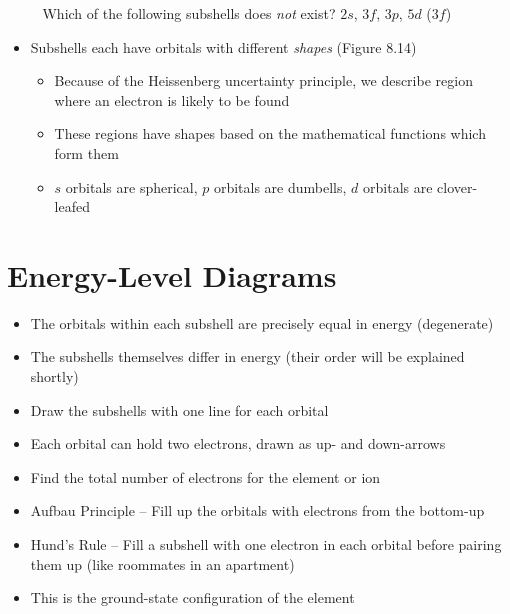 \documentclass[12pt, openany, letterpaper]{memoir}
\begin{document}
\begin{itemize}
	      ~\hphantom{Practice:} Which of the following subshells does \emph{not} exist? $2s$, $3f$, $3p$, $5d$ ($3f$)
	\item Subshells each have orbitals with different \emph{shapes} (Figure 8.14)
	      \begin{itemize}
		      \item Because of the Heissenberg uncertainty principle, we describe region where an electron is likely to be found
		      \item These regions have shapes based on the mathematical functions which form them
		      \item $s$ orbitals are spherical, $p$ orbitals are dumbells, $d$ orbitals are clover-leafed
	      \end{itemize}
\end{itemize}
\section{Energy-Level Diagrams}
\begin{itemize}
	\item The orbitals within each subshell are precisely equal in energy (degenerate)
	\item The subshells themselves differ in energy (their order will be explained shortly)
	\item Draw the subshells with one line for each orbital
	\item Each orbital can hold two electrons, drawn as up- and down-arrows
	\item Find the total number of electrons for the element or ion
	\item Aufbau Principle -- Fill up the orbitals with electrons from the bottom-up
	\item Hund's Rule -- Fill a subshell with one electron in each orbital before pairing them up (like roommates in an apartment)
	\item This is the ground-state configuration of the element
\end{itemize}
\end{document}
